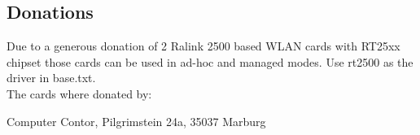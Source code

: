 \subsection{Donations}

Due to a generous donation of 2 Ralink 2500 based WLAN cards with RT25xx chipset 
those cards can be used in ad-hoc and managed modes. Use rt2500 as the driver in 
base.txt.\\

The cards where donated by:

Computer Contor, Pilgrimstein 24a, 35037 Marburg
